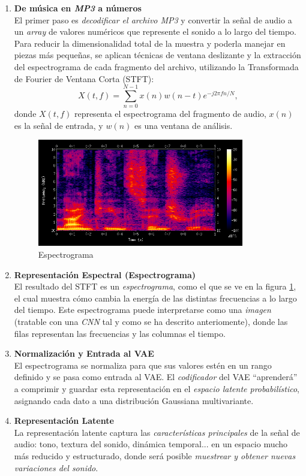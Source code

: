 \begin{enumerate}
    \item \textbf{De música en \emph{MP3} a números} \\
    El primer paso es \emph{decodificar el archivo MP3} y convertir la señal de audio a un \emph{array} de valores numéricos que represente el sonido a lo largo del tiempo. Para reducir la dimensionalidad total de la muestra y poderla manejar en piezas más pequeñas, se aplican técnicas de ventana deslizante y la extracción del espectrograma de cada fragmento del archivo, utilizando la Transformada de Fourier de Ventana Corta (STFT):
    \[
        X(t, f) = \sum_{n=0}^{N-1} x(n)w(n-t)e^{-j2\pi fn/N},
    \]
    donde $X(t, f)$ representa el espectrograma del fragmento de audio, $x(n)$ es la señal de entrada, y $w(n)$ es una ventana de análisis.

    \begin{figure}[H]
      \centering
      \includegraphics[width=0.85\textwidth]{images/espectrograma.png}
      \caption{Espectrograma}
      \label{fig:espectrograma}
    \end{figure}

    \item \textbf{Representación Espectral (Espectrograma)} \\
    El resultado del STFT es un \emph{espectrograma}, como el que se ve en la figura \ref{fig:espectrograma}, el cual muestra cómo cambia la energía de las distintas frecuencias a lo largo del tiempo. Este espectrograma puede interpretarse como una \emph{imagen} (tratable con una \emph{CNN} tal y como se ha descrito anteriomente), donde las filas representan las frecuencias y las columnas el tiempo.

    \item \textbf{Normalización y Entrada al VAE} \\
    El espectrograma se normaliza para que sus valores estén en un rango definido y se pasa como entrada al VAE. El \emph{codificador} del VAE ``aprenderá'' a comprimir y guardar esta representación en el \emph{espacio latente probabilístico}, asignando cada dato a una distribución Gaussiana multivariante.

    \item \textbf{Representación Latente} \\
    La representación latente captura las \emph{características principales} de la señal de audio: tono, textura del sonido, dinámica temporal... en un espacio mucho más reducido y estructurado, donde será posible \emph{muestrear y obtener nuevas variaciones del sonido}.
\end{enumerate}

